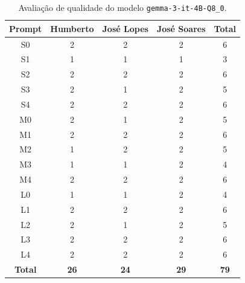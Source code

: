 \begin{table}[H]
    \centering
    \begin{tabular}{|c|c|c|c|c|}
        \hline
        \textbf{Prompt}      &
        \textbf{Humberto}    &
        \textbf{José Lopes}  &
        \textbf{José Soares} &
        \textbf{Total}       \\ \hline

        S0 & 2 & 2 & 2 & 6 \\ \hline
        S1 & 1 & 1 & 1 & 3 \\ \hline
        S2 & 2 & 2 & 2 & 6 \\ \hline
        S3 & 2 & 1 & 2 & 5 \\ \hline
        S4 & 2 & 2 & 2 & 6 \\ \hline
        M0 & 2 & 1 & 2 & 5 \\ \hline
        M1 & 2 & 2 & 2 & 6 \\ \hline
        M2 & 1 & 2 & 2 & 5 \\ \hline
        M3 & 1 & 1 & 2 & 4 \\ \hline
        M4 & 2 & 2 & 2 & 6 \\ \hline
        L0 & 1 & 1 & 2 & 4 \\ \hline
        L1 & 2 & 2 & 2 & 6 \\ \hline
        L2 & 2 & 1 & 2 & 5 \\ \hline
        L3 & 2 & 2 & 2 & 6 \\ \hline
        L4 & 2 & 2 & 2 & 6 \\ \hline

        \textbf{Total} & \textbf{26} & \textbf{24} & \textbf{29} & \textbf{79} \\ \hline
    \end{tabular}
    \caption{Avaliação de qualidade do modelo \texttt{gemma-3-it-4B-Q8\_0}.}
\end{table}

